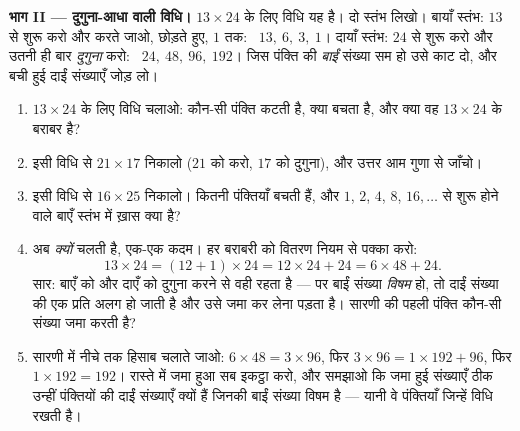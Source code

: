 \begin{problem}
\medskip
\noindent\textbf{भाग II --- दुगुना-आधा वाली विधि।}
$13 \times 24$ के लिए विधि यह है। दो स्तंभ लिखो। बायाँ स्तंभ:
$13$ से शुरू करो और \emph{} करते जाओ,  छोड़ते हुए,
$1$ तक: \ $13,\ 6,\ 3,\ 1$। दायाँ स्तंभ: $24$ से शुरू करो और
उतनी ही बार \emph{दुगुना} करो: \ $24,\ 48,\ 96,\ 192$। जिस
पंक्ति की \emph{बाईं} संख्या सम हो उसे काट दो, और बची हुई दाईं
संख्याएँ जोड़ लो।
\begin{enumerate}[resume]
  \item $13 \times 24$ के लिए विधि चलाओ: कौन-सी पंक्ति कटती है,
        क्या  बचता है, और क्या वह $13 \times 24$ के बराबर
        है?
  \item इसी विधि से $21 \times 17$ निकालो ($21$ को  करो,
        $17$ को दुगुना), और उत्तर आम गुणा से जाँचो।
  \item इसी विधि से $16 \times 25$ निकालो। कितनी पंक्तियाँ बचती
        हैं, और $1$, $2$, $4$, $8$, $16, \dots$ से शुरू होने वाले
        बाएँ स्तंभ में ख़ास क्या है?
  \item अब \emph{क्यों} चलती है, एक-एक कदम। हर बराबरी को वितरण
        नियम से पक्का करो:
        \[
        13 \times 24 = (12 + 1) \times 24
        = 12 \times 24 + 24 = 6 \times 48 + 24 .
        \]
        सार: बाएँ को  और दाएँ को दुगुना करने से  वही
        रहता है --- पर बाईं संख्या \emph{विषम} हो, तो दाईं संख्या
        की एक प्रति अलग हो जाती है और उसे जमा कर लेना पड़ता है।
        सारणी की पहली पंक्ति कौन-सी संख्या जमा करती है?
  \item सारणी में नीचे तक हिसाब चलाते जाओ:
        $6 \times 48 = 3 \times 96$, फिर
        $3 \times 96 = 1 \times 192 + 96$, फिर
        $1 \times 192 = 192$। रास्ते में जमा हुआ सब इकट्ठा करो,
        और समझाओ कि जमा हुई संख्याएँ ठीक उन्हीं पंक्तियों की दाईं
        संख्याएँ क्यों हैं जिनकी बाईं संख्या विषम है --- यानी वे
        पंक्तियाँ जिन्हें विधि रखती है।
\end{enumerate}


\end{problem}
